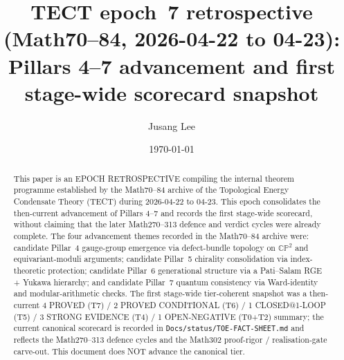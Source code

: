 



\title{TECT epoch~7 retrospective (Math70--84, 2026-04-22 to 04-23):
Pillars 4--7 advancement and first stage-wide scorecard snapshot}

\author{Jusang Lee}

\date{\today}

\begin{abstract}
This paper is an EPOCH RETROSPECTIVE compiling the internal theorem
programme established by the Math70--84 archive of the Topological
Energy Condensate Theory (TECT) during 2026-04-22 to 04-23. This
epoch consolidates the then-current advancement of Pillars 4--7 and
records the first stage-wide scorecard, without claiming that the
later Math270--313 defence and verdict cycles were already complete.
The four advancement themes recorded in the Math70--84 archive were:
candidate Pillar~4 gauge-group emergence via defect-bundle topology
on $\mathbb{CP}^2$ and equivariant-moduli arguments; candidate
Pillar~5 chirality consolidation via index-theoretic protection;
candidate Pillar~6 generational structure via a Pati--Salam RGE +
Yukawa hierarchy; and candidate Pillar~7 quantum consistency via
Ward-identity and modular-arithmetic checks. The first stage-wide
tier-coherent snapshot was a then-current 4 PROVED (T7) / 2 PROVED
CONDITIONAL (T6) / 1 CLOSED@1-LOOP (T5) / 3 STRONG EVIDENCE (T4) /
1 OPEN-NEGATIVE (T0+T2) summary; the current canonical scorecard is
recorded in \texttt{Docs/status/TOE-FACT-SHEET.md} and reflects the
Math270--313 defence cycles and the Math302 proof-rigor /
realisation-gate carve-out. This document does NOT advance the
canonical tier.
\end{abstract}

